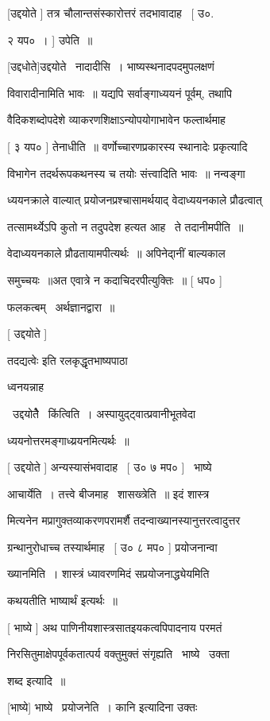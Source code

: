 \documentclass[11pt, openany]{book}
\begin{document}
[उद्दयोते ] तत्र चौलान्तसंस्कारोत्तरं तदभावादाह \textendash\ [ उ०. 

२ यप०~। ] उपेति~॥ 

[उद्दधोते]उद्दयोते \textendash\ नादादीसि~। भाष्यस्थनादपदमुपलक्षणं 

विवारादीनामिति भावः~॥ यद्यपि सर्वाङ्गाध्ययनं पूर्वम्, तथापि 

वैदिकशब्दोपदेशे व्याकरणशिक्षाऽन्योपयोगाभावेन फल्तार्थमाह \textendash\ 

[ ३ यप० ] तेनाधीति~॥ वर्णोच्चारणप्रकारस्य स्थानादेः प्रकृत्यादि \textendash\ 

विभागेन तदर्थरूपकथनस्य च तयोः संत्त्वादिति भावः~॥ नन्वङ्गा \textendash\ 

ध्ययनक्राले वाल्यात् प्रयोजनप्रश्चासामर्थयाद् वेदाध्ययनकाले प्रौढत्वात्


तत्सामर्थ्येऽपि कुतो न तदुपदेश हत्यत आह \textendash\ ते तदानीमपीति~॥ 

वेदाध्ययनकाले प्रौढतायामपीत्यर्थः~॥ अपिनेदा्नीं बाल्यकाल \textendash\ 

समुच्चयः~॥अत एवात्रे न कदाचिदरपीत्युक्तिः~॥ [ धप० ] 

फलकत्बम् \textendash\ अर्थज्ञानद्वारा~॥ 

[ उद्दयोते ] {\qt तदद्यत्वेः इति रलकृद्धृतभाष्यपाठा 

ध्वनयन्नाह} \textendash\ उद्दयोतैे \textendash\ किंत्विति~। अस्पायुद्ट्वात्प्रवानीभूतवेदा \textendash\ 

ध्ययनोत्तरमङ्गाध्य्रयनमित्यर्थः~॥ 

[ उद्दयोते ] अन्यस्यासंभवादाह \textendash\ [ उ० ७ मप० ] \textendash\ भाष्ये 

आचार्येति~। तत्त्वे बीजमाह \textendash\ शासख्त्रेति~॥ इदं शास्त्र \textendash\ 

मित्यनेन मप्रागुक्तव्याकरणपरामर्शै तदन्वाख्यानस्यानुत्तरत्वादुत्तर \textendash\ 

ग्रन्थानुरोधाच्च तस्यार्थमाह \textendash\ [ उ० ८ मप० ] प्रयोजनान्वा \textendash\ 

ख्यानमिति~। शास्त्रं ध्यावरणमिदं सप्रयोजनाद्ध्येयमिति 

कथयतीति भाष्यार्थं इत्यर्थः~॥ 

[ भाष्ये ] अथ पाणिनीयशास्त्रसातइयकत्वपिपादनाय परमतं 

निरसितुमाक्षेपपूर्वकतात्पर्य वक्तुमुक्तं संगृह्यति \textendash\ भाष्ये \textendash\ उक्ता 

शब्द इत्यादि~॥ 

[भाष्ये] भाष्ये \textendash\ प्रयोजनेति~। {\qt कानि} इत्यादिना उक्तः \textendash\ 
\end{document}
